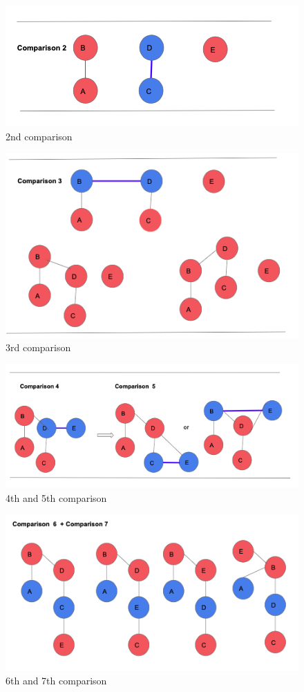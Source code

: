 \documentclass[12pt]{article}
\theoremstyle{plain}
\begin{document}
\begin{figure}[h]
\includegraphics[width=12cm]{22.png}
\centering
\caption{2nd comparison}
\label{BF}
\end{figure}


\begin{figure}[h]
\includegraphics[width=12cm]{23.png}
\centering
\caption{3rd comparison}
\label{BF}
\end{figure}

\begin{figure}[h]
\includegraphics[width=12cm]{24.png}
\centering
\caption{4th and 5th comparison}
\label{BF}
\end{figure}

\begin{figure}[h]
\includegraphics[width=12cm]{25.png}
\centering
\caption{6th and 7th comparison}
\label{BF}
\end{figure}
\end{document}
